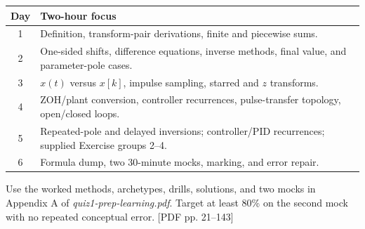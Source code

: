 \documentclass[10pt]{article}
\newcommand{\src}[1]{\hfill{\small\color{gray}[PDF pp. #1]}}
\begin{document}
\begin{center}
\begin{tabular}{c p{}}
\toprule
Day & Two-hour focus\\
\midrule
1 & Definition, transform-pair derivations, finite and piecewise sums.\\
2 & One-sided shifts, difference equations, inverse methods, final value, and parameter-pole cases.\\
3 & $x(t)$ versus $x[k]$, impulse sampling, starred and $z$ transforms.\\
4 & ZOH/plant conversion, controller recurrences, pulse-transfer topology, open/closed loops.\\
5 & Repeated-pole and delayed inversions; controller/PID recurrences; supplied Exercise groups 2--4.\\
6 & Formula dump, two 30-minute mocks, marking, and error repair.\\
\bottomrule
\end{tabular}
\end{center}

Use the worked methods, archetypes, drills, solutions, and two mocks in Appendix A of \emph{quiz1-prep-learning.pdf}. Target at least 80\% on the second mock with no repeated conceptual error. \src{21--143}
\end{document}
